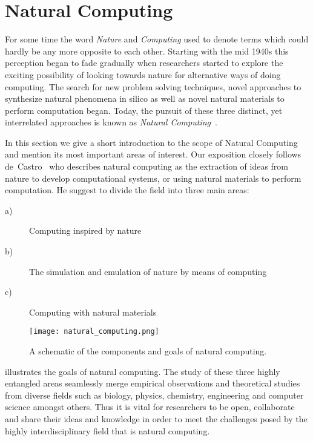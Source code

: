 \section{Natural Computing}

	For some time the word \emph{Nature} and \emph{Computing} used to denote terms which could hardly be any more opposite to each other. Starting with the mid 1940s this perception began to fade gradually when researchers started to explore the exciting possibility of looking towards nature for alternative ways of doing computing. The search for new problem solving techniques, novel approaches to synthesize natural phenomena in silico as well as novel natural materials to perform computation began. Today, the pursuit of these three distinct, yet interrelated approaches is known as \emph{Natural Computing}~\cite{de2005natural,de2006fundamentals}.

	In this section we give a short introduction to the scope of Natural Computing and mention its most important areas of interest. Our exposition closely follows de~Castro~\cite{de2007fundamentals} who describes natural computing as the extraction of ideas from nature to develop computational systems, or using natural materials to perform computation. He suggest to divide the field into three main areas:

	\begin{description}
		\item[a)] Computing inspired by nature
		\item[b)] The simulation and emulation of nature by means of computing
		\item[c)] Computing with natural materials
	\end{description}

	\begin{figure}
			\centering
			\texttt{[image: natural\_computing.png]}
			\caption[The goals of natural computing.]{A schematic of the components and goals of natural computing.}
			\label{fig:natural_computing}
	\end{figure}

	 illustrates the goals of natural computing. The study of these three highly entangled areas seamlessly merge empirical observations and theoretical studies from diverse fields such as biology, physics, chemistry, engineering and computer science amongst others. Thus it is vital for researchers to be open, collaborate and share their ideas and knowledge in order to meet the challenges posed by the highly interdisciplinary field that is natural computing.


